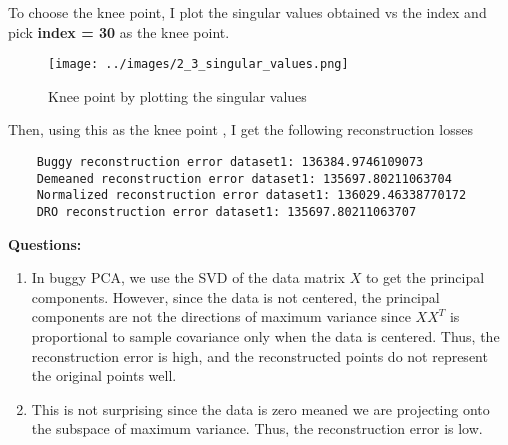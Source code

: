 \documentclass[a4paper]{article}
\theoremstyle{definition}
\begin{document}
To choose the knee point, I plot the singular values obtained vs the index and pick \textbf{index = 30} as the knee point. \\
\begin{figure}[H]
    \centering
    \texttt{[image: ../images/2\_3\_singular\_values.png]}
    \caption{Knee point by plotting the singular values}
    \label{fig:rec_1000d}
\end{figure}

Then, using this as the knee point , I get the following reconstruction losses
\begin{verbatim}
    Buggy reconstruction error dataset1: 136384.9746109073
    Demeaned reconstruction error dataset1: 135697.80211063704
    Normalized reconstruction error dataset1: 136029.46338770172
    DRO reconstruction error dataset1: 135697.80211063707    
\end{verbatim}


\textbf{Questions: }\\
\begin{enumerate}
    \item In buggy PCA, we use the SVD of the data matrix $X$ to get the principal components. However, since the data is not centered, the principal components are not the directions of maximum variance since $XX^T$ is proportional to sample covariance only when the data is centered. Thus, the reconstruction error is high, and the reconstructed points do not represent the original points well.
    \item This is not surprising since the data is zero meaned we are projecting onto the subspace of maximum variance. Thus, the reconstruction error is low.
\end{enumerate}





\end{document}
